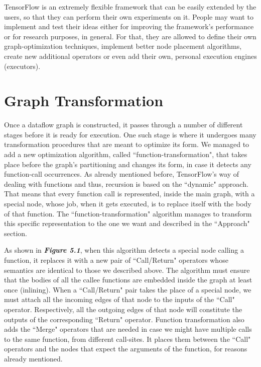 \documentclass[ack,preface]{dithesis}
\begin{document}
TensorFlow is an extremely flexible framework that  can be easily extended by the users, so that they can perform their own experiments on it. People may want to implement and test their  ideas either for improving the framework's performance or for research purposes, in general. For that, they are allowed to define their own graph-optimization techniques, implement better node placement algorithms, create new additional operators or even add their own, personal execution engines (executors).

    \section{Graph Transformation}
Once a dataflow graph is constructed, it passes through a number of different stages before it is ready for execution. One such stage is where it undergoes many transformation procedures that are meant to optimize its form. We managed to add a new optimization algorithm, called ``function-transformation", that takes place before the graph's partitioning and changes its form, in case it detects any function-call occurrences.
As already mentioned before, TensorFlow's  way of dealing with functions and thus, recursion is based on the ``dynamic" approach. That means that every function call is represented, inside the main graph, with a special node, whose job, when it gets executed, is to replace itself with the body of that function. The ``function-transformation" algorithm  manages to transform this specific representation to the one we want and described in the ``Approach" section. 

As shown in \textit{\textbf{Figure 5.1}}, when this algorithm detects a special node calling a function, it replaces it with a new pair of ``Call/Return" operators whose semantics are identical to those we described above. The algorithm must ensure that the bodies of all the callee functions are embedded inside the graph at least once (inlining).
When a ``Call/Return" pair takes the place of a special node, we must attach all the incoming edges of that node to the inputs of the ``Call" operator. Respectively, all the outgoing edges of that node will constitute the outputs of the corresponding ``Return" operator. Function transformation also adds the ``Merge" operators that are needed in case we might have multiple calls to the same function, from different call-sites. It places them between the ``Call" operators and the nodes that expect the arguments of the function, for reasons already mentioned.
\end{document}
